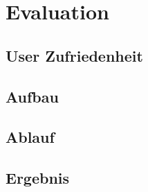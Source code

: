 \chapter{Evaluation}

	\section{User Zufriedenheit}
	
		\section{Aufbau}
		
		\section{Ablauf}
		
		\section{Ergebnis}